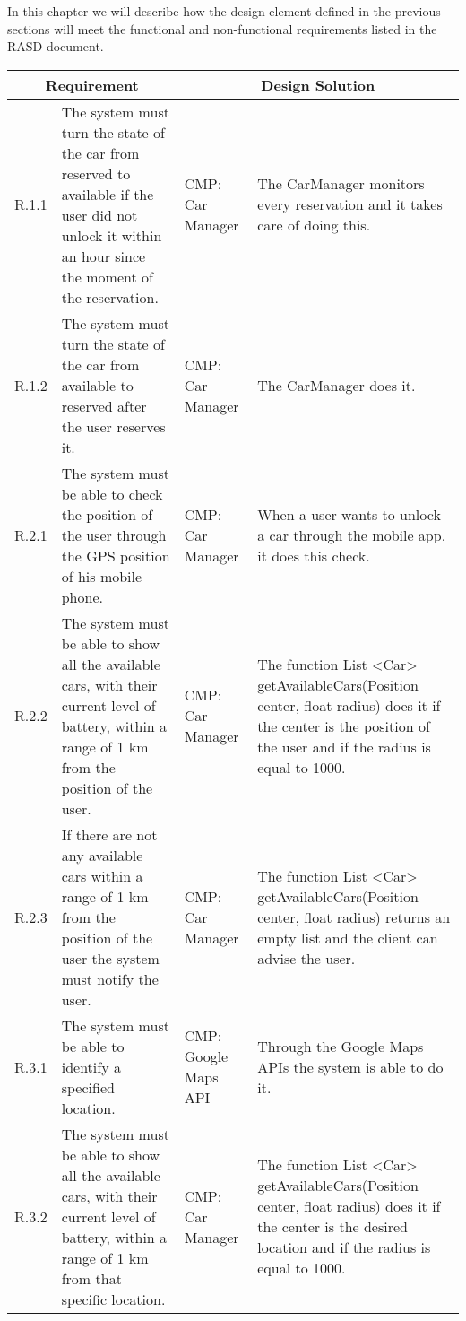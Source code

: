 In this chapter we will describe how the design element defined in the previous sections will meet the functional and non-functional requirements listed in the RASD document.

\begin{center}
\begin{longtable}{|p{}|p{}|>{\raggedright\arraybackslash}p{}|>{\raggedright\arraybackslash}p{}|}
\hline
\multicolumn{2}{|c|}{\textbf{Requirement}} & \multicolumn{2}{c|}{\textbf{Design Solution}} \\ \hline
R.1.1 & The system must turn the state of the car from reserved to available if the user did not unlock it within an hour since the moment of the reservation. & CMP: \linebreak Car Manager & The CarManager monitors every reservation and it takes care of doing this.  \\ \hline
R.1.2 & The system must turn the state of the car from available to reserved after the user reserves it. & CMP: Car Manager & The CarManager does it. \\ \hline
R.2.1 & The system must be able to check the position of the user through the GPS position of his mobile phone. & CMP: Car Manager & When a user wants to unlock a car through the mobile app, it does this check. \\ \hline
R.2.2 & The system must be able to show all the available cars, with their current level of battery, within a range of 1 km from the position of the user. & CMP: Car Manager & The function List \textless Car\textgreater{} getAvailableCars(Position center, float radius) does it if the center is the position of the user and if the radius is equal to 1000. \\ \hline
R.2.3 & If there are not any available cars within a range of 1 km from the position of the user the system must notify the user. & CMP: Car Manager & The function List \textless Car\textgreater{} getAvailableCars(Position center, float radius) returns an empty list and the client can advise the user. \\ \hline
R.3.1 & The system must be able to identify a specified location. & CMP: Google Maps API & Through the Google Maps APIs the system is able to do it. \\ \hline
R.3.2 & The system must be able to show all the available cars, with their current level of battery, within a range of 1 km from that specific location. & CMP: Car Manager & The function List \textless Car\textgreater{} getAvailableCars(Position center, float radius) does it if the center is the desired location and if the radius is equal to 1000. \\ \hline

\end{longtable}
\end{center}
